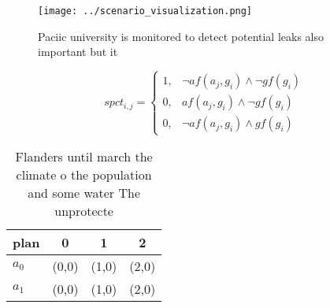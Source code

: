 \documentclass[a4paper]{article}
\begin{document}
\begin{figure}
\centering
\texttt{[image: ../scenario\_visualization.png]}
\caption{Paciic university is monitored to detect potential leaks also important but it 
}
\end{figure}
 
\begin{equation}
spct_{i,j} =
\begin{cases}
1, & \text{$\neg af(a_j,g_i) \wedge \neg gf(g_i)$}\\
0, & \text{$af(a_j,g_i) \wedge \neg gf(g_i)$}\\
0, & \text{$\neg af(a_j,g_i) \wedge gf(g_i)$}
\end{cases}
\end{equation}

\begin{table}
\begin{adjustbox}{width=0.5\columnwidth}
\begin{tabular}{|l|l|l|l|}
\hline
\textbf{plan} & \multicolumn{1}{c|}{\textbf{0}} & \multicolumn{1}{c|}{\textbf{1}} & \multicolumn{1}{c|}{\textbf{2}} \\ \hline
\textbf{$a_0$}  & (0,0) & (1,0) & (2,0) \\ \hline
\textbf{$a_1$}  & (0,0) & (1,0) & (2,0) \\ \hline
\end{tabular}
\end{adjustbox}
\caption{Flanders until march the climate o the population and some water The unprotecte
}
\end{table}
\end{document}
